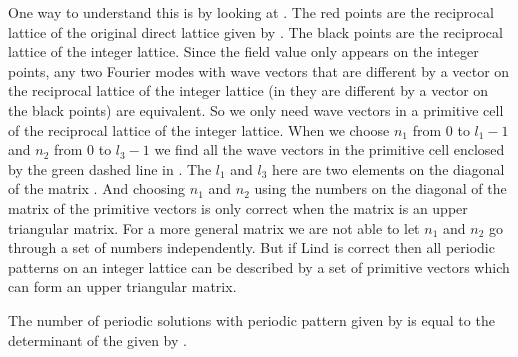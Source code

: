 \begin{description}
{One way to understand this is by looking at . The red
points are the reciprocal lattice of the original direct lattice given by
. The black points are the reciprocal lattice of the
integer lattice. Since the field value only appears on the integer points, any
two Fourier modes with wave vectors that are different by a vector on the
reciprocal lattice of the integer lattice (in 
they are different by a vector on the black points) are equivalent. So we only
need wave vectors in a primitive cell of the reciprocal lattice of the integer
lattice. When we choose $n_1$ from 0 to $l_1 - 1$ and $n_2$ from 0 to $l_3 - 1$
we find all the wave vectors in the primitive cell enclosed by the green dashed
line in . The $l_1$ and $l_3$ here are two
elements on the diagonal of the matrix . And choosing $n_1$
and $n_2$ using the numbers on the diagonal of the matrix of the primitive
vectors is only correct when the matrix is an upper triangular matrix. For a more
general matrix we are not able to let $n_1$ and $n_2$ go through a set of numbers
independently. But if Lind is correct then all periodic patterns on an integer
lattice can be described by a set of primitive vectors which can form an upper
triangular matrix.

The number of periodic solutions with periodic pattern given by
 is equal to the determinant of the {\jacobianOrb} given by
.
}

\end{description}
